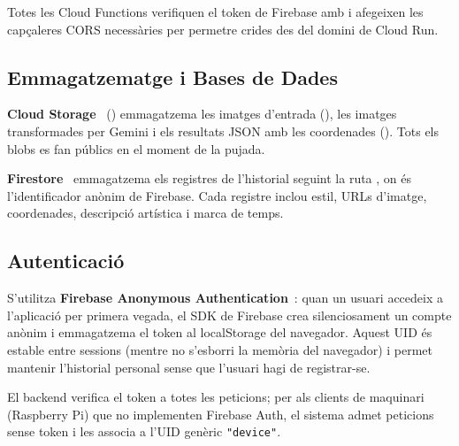 Totes les Cloud Functions verifiquen el token de Firebase amb
i afegeixen les capçaleres CORS necessàries per permetre crides des del domini de Cloud Run.

\subsection{Emmagatzematge i Bases de Dades}

\textbf{Cloud Storage}~\cite{gcs} () emmagatzema les imatges d'entrada (), les imatges transformades per Gemini i els resultats JSON amb les coordenades (). Tots els blobs es fan públics en el moment de la pujada.

\textbf{Firestore}~\cite{firestore} emmagatzema els registres de l'historial seguint la ruta , on  és l'identificador anònim de Firebase. Cada registre inclou estil, URLs d'imatge, coordenades, descripció artística i marca de temps.

\subsection{Autenticació}

S'utilitza \textbf{Firebase Anonymous Authentication}~\cite{firebase}: quan un usuari accedeix a l'aplicació per primera vegada, el SDK de Firebase crea silenciosament un compte anònim i emmagatzema el token al localStorage del navegador. Aquest UID és estable entre sessions (mentre no s'esborri la memòria del navegador) i permet mantenir l'historial personal sense que l'usuari hagi de registrar-se.

El backend verifica el token a totes les peticions; per als clients de maquinari (Raspberry Pi) que no implementen Firebase Auth, el sistema admet peticions sense token i les associa a l'UID genèric \texttt{"device"}.
